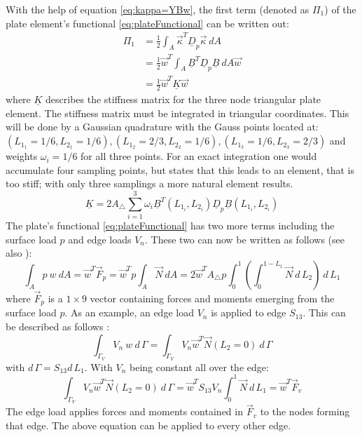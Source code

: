   With the help of equation \eqref{eq:kappa=YBw}, the first term (denoted as $\Pi_1$) of the plate element's functional \eqref{eq:plateFunctional} can be written out:
  \begin{align}\label{eq:t3_pi1=0.5wTKw}
  \Pi_1 &= \frac{1}{2} \int_A \vec{\kappa}^T \underline{D}_p \vec{\kappa}\ d\!A \nonumber\\
        &= \frac{1}{2} \vec{w}^T \int_A \underline{B}^T \underline{D}_p \underline{B}\ d\!A \vec{w} \nonumber\\
        &= \frac{1}{2} \vec{w}^T \underline{K} \vec{w}
  \end{align}
  where $\underline{K}$ describes the stiffness matrix for the three node triangular plate element. The stiffness matrix must be integrated in triangular coordinates. This will be done by a Gaussian quadrature with the Gauss points located at: $(L_{1_1} = 1/6, L_{2_1} = 1/6), (L_{1_2} = 2/3, L_{2_2} = 1/6), (L_{1_3} = 1/6, L_{2_3} = 2/3)$ and weights $\omega_i = 1/6$ for all three points. For an exact integration one would accumulate four sampling points, but \cite{steinke2005finite} states that this leads to an element, that is too stiff; with only three samplings a more natural element results.
  \begin{equation}
  \underline{K} = 2 A_\triangle \sum_{i=1}^{3} \omega_i \underline{B}^T(L_{1_i}, L_{2_i}) \underline{D}_p \underline{B}(L_{1_i}, L_{2_i})
  \end{equation}
  The plate's functional \eqref{eq:plateFunctional} has two more terms including the surface load $p$ and edge loads $V_n$. These two can now be written as follows (see also \cite{steinke2005finite}):
  \begin{equation}
  \int_A p\ w\ d\!A = \vec{w}^T \vec{F}_p = \vec{w}^T p \int_A \vec{N}\ d\!A = 2 \vec{w}^T A_\triangle p \int_{0}^{1}\left(\int_{0}^{1-L_1} \vec{N}\ d\,\!L_2\right)\ d\,\!L_1
  \end{equation}
  where $\vec{F}_p$ is a $1\!\times\!9$ vector containing forces and moments emerging from the surface load $p$.
  As an example, an edge load $V_n$ is applied to edge $S_{13}$. This can be described as follows \cite{steinke2005finite}:
  \begin{equation}
  \int_{\Gamma_V} V_n\:w\ d\,\!\Gamma = \int_{\Gamma_V} V_n \vec{w}^T \vec{N}(L_2 = 0)\ d\,\!\Gamma
  \end{equation}
  with $d\,\!\Gamma = S_{13} d\,\!L_1$. With $V_n$ being constant all over the edge:
  \begin{equation}
  \int_{\Gamma_V} V_n \vec{w}^T \vec{N}(L_2 = 0)\ d\,\!\Gamma = \vec{w}^T S_{13} V_n \int_{0}^{1} \vec{N}\ d\,\!L_1 = \vec{w}^T \vec{F}_v
  \end{equation}
  The edge load applies forces and moments contained in $\vec{F}_v$ to the nodes forming that edge. The above equation can be applied to every other edge.
  
